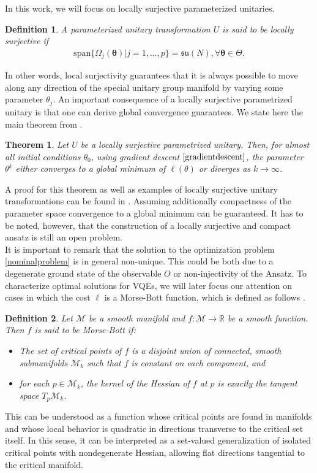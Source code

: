 \documentclass[letterpaper, 10 pt]{IEEEtran}  %
\newtheorem{definition}{Definition}
\newtheorem{theorem}{Theorem}
\begin{document}
In this work, we will focus on locally surjective parameterized unitaries. 
\begin{definition}
   A parameterized unitary transformation $U$ is said to be locally surjective if 
   \begin{align}
      \mathrm{span}\{\Omega_j(\mathbf{\theta}) | j=1,\dots, p\}=\mathfrak{su}(N),  \forall \mathbf{\theta} \in \Theta.
   \end{align} 
\end{definition}

In other words, local surjectivity guarantees that it is always possible to move along any direction of the special unitary group manifold by varying some parameter $\theta_j$. 
An important consequence of a locally surjective parametrized unitary is that one can derive global convergence guarantees.
We state here the main theorem from \cite{Wiedmann2025}.   
\begin{theorem} 
   Let $U$ be a locally surjective parametrized unitary. Then, for almost all initial conditions $\theta_0$, using gradient descent $\eqref{gradientdescent}$, the parameter $\theta^k$ either converges to a global minimum of $\ell(\theta)$ or diverges as $k\rightarrow\infty$. 
\end{theorem}
A proof for this theorem as well as examples of locally surjective unitary transformations can be found in \cite{Wiedmann2025}.
Assuming additionally compactness of the parameter space convergence to a global minimum can be guaranteed. It has to be noted, however, that the construction of a locally surjective and compact ansatz is still an open problem. 
\\

It is important to remark that the solution to the optimization problem \eqref{nominalproblem} is in general non-unique. This could be both due to a degenerate ground state of the observable $O$
or non-injectivity of the Ansatz.
To characterize optimal solutions for VQEs, we will later focus our attention on cases in which the cost $\ell$ is a Morse-Bott function, which is defined as follows \cite[Def 2.6.1]{Nicolaescu2011}.
\begin{definition}
   Let $\mathcal{M}$ be a smooth manifold and $f: \mathcal{M} \rightarrow \mathbb{R}$ be a smooth function. Then $f$ is said to be
   Morse-Bott if:
   \begin{itemize}
      \item[1.] The set of critical points of $f$ is a disjoint union of connected, smooth submanifolds $\mathcal{M}_k$ such that
      $f$ is constant on each component, and
      \item[2.] for each $p \in \mathcal{M}_k$, the kernel of the Hessian of $f$ at $p$ is exactly the tangent space $T_p \mathcal{M}_k$.
   \end{itemize}
\end{definition}
This can be understood as a function whose critical points are found in manifolds and whose local behavior is quadratic in directions 
transverse to the critical set itself. In this sense, it can be interpreted as a set-valued generalization of isolated critical points with nondegenerate Hessian, allowing flat
directions tangential to the critical manifold. 
\end{document}

